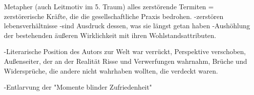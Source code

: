\documentclass{article}
\begin{document}
\par

Metapher (auch Leitmotiv im 5. Traum) alles zerstörende Termiten = zerstörerische Kräfte, die die gesellschaftliche Praxis bedrohen.
-\guilsinglright zerstören lebensverhältnisse
-\guilsinglright sind Ausdruck dessen, was sie längst getan haben -\guilsinglright Aushöhlung der bestehenden äußeren Wirklichkeit mit ihren Wohlstandsattributen.

\textcolor{myOrange}{-\guilsinglright Literarische Position des Autors zur Welt war verrückt, Perspektive verschoben, Außenseiter, der an der Realität Risse und Verwerfungen wahrnahm, Brüche und Widersprüche, die andere nicht wahrhaben wollten, die verdeckt waren.}

-\guilsinglright Entlarvung der "Momente blinder Zufriedenheit"




\end{document}
